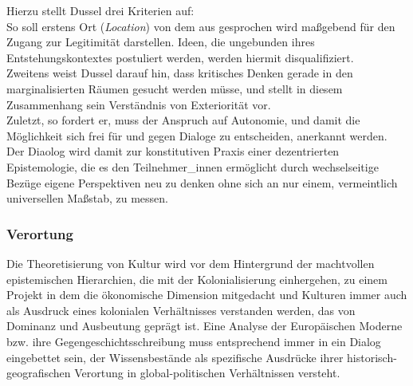 \noindent Hierzu stellt Dussel drei Kriterien auf: \\
So soll erstens Ort (\textit{Location}) von dem
aus gesprochen wird maßgebend für den Zugang zur Legitimität darstellen. Ideen,
die ungebunden ihres Entstehungskontextes postuliert werden, werden hiermit
disqualifiziert.\\
 Zweitens weist Dussel darauf hin, dass kritisches Denken gerade
in den marginalisierten Räumen gesucht werden müsse, und stellt in diesem
Zusammenhang sein Verständnis von Exteriorität vor. \\
Zuletzt, so fordert er, muss
der Anspruch auf Autonomie, und damit die Möglichkeit sich frei für und gegen
Dialoge zu entscheiden, anerkannt werden.\\

\noindent Der Diaolog wird damit zur konstitutiven Praxis einer dezentrierten
Epistemologie, die es den Teilnehmer\_innen ermöglicht durch wechselseitige
Bezüge eigene Perspektiven neu zu denken ohne sich an nur einem, vermeintlich
universellen Maßstab, zu messen.

\subsubsection{Verortung}

Die Theoretisierung von Kultur wird vor dem Hintergrund der machtvollen
epistemischen Hierarchien, die mit der Kolonialisierung einhergehen, zu einem
Projekt in dem die ökonomische Dimension mitgedacht und Kulturen immer auch als
Ausdruck eines kolonialen Verhältnisses verstanden werden, das von Dominanz und
Ausbeutung geprägt ist.\footnotemark {} Eine Analyse der Europäischen Moderne bzw. ihre
Gegengeschichtsschreibung muss entsprechend immer in ein Dialog eingebettet
sein, der Wissensbestände als spezifische Ausdrücke ihrer
historisch-geografischen Verortung in global-politischen Verhältnissen versteht.\\

